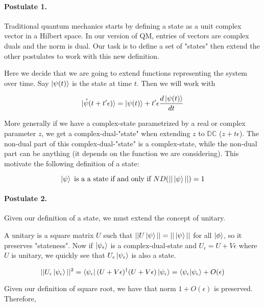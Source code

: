 \documentclass{article}
\newcommand{\DC}{\mathbb{DC}}
\newcommand{\e}{\epsilon}
\begin{document}
\paragraph{Postulate 1.} Traditional quantum mechanics starts by defining a state as a unit complex vector in a Hilbert space. In our version of QM, entries of vectors are complex duals and the norm is dual. Our task is to define a set of "states" then extend the other postulates to work with this new definition.

Here we decide that we are going to extend functions representing the system over time. Say $\ket{\psi(t)}$ is the state at time $t$. Then we will work with

\begin{equation}
\ket{\hat{\psi}(t + t' \e)} = \ket{\psi(t)} + t' \e \frac{d\ket{\psi(t)}}{dt}
\end{equation}

More generally if we have a complex-state parametrized by a real or complex parameter $z$, we get a complex-dual-"state" when extending $z$ to $\DC$ ($z + t\e$). The non-dual part of this complex-dual-"state" is a complex-state, while the non-dual part can be anything (it depends on the function we are considering). This motivate the following definition of a state:

\begin{equation}
\ket{\psi} \text{ is a a state if and only if } ND(|| \ket{\psi} ||) = 1
\end{equation}

\paragraph{Postulate 2.} Given our definition of a state, we must extend the concept of unitary.

A unitary is a square matrix $U$ such that $||U \ket{\psi}|| = ||\ket{\psi}||$ for all $\ket{\phi}$, so it preserves "stateness". Now if $\ket{\psi_\e}$ is a complex-dual-state and $U_{\e} = U + V \e$ where $U$ is unitary, we quickly see that $U_{\e} \ket{\psi_\e}$ is also a state.

\begin{equation}
||U_{\e} \ket{\psi_\e}||^2 = \bra{\psi_\e} (U + V \e)^\dagger (U + V \e) \ket{\psi_\e} = \braket{\psi_\e | \psi_\e} + O(\e)
\end{equation}

Given our definition of square root, we have that norm $1 + O(\e)$ is preserved. Therefore,
\end{document}

